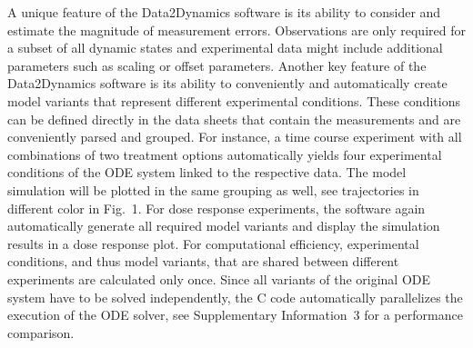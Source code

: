 \documentclass{bioinfo}
\begin{document}
A unique feature of the Data2Dynamics software is its ability to consider and estimate the magnitude of measurement errors.
Observations are only required for a subset of all dynamic states and experimental data %
might include additional parameters such as scaling or offset parameters.%
Another key feature of the Data2Dynamics software is its ability to conveniently and automatically create model variants that represent different experimental conditions. These conditions can be defined directly in the data sheets that contain the measurements and are conveniently parsed and grouped. 
For instance, a time course experiment 
with all combinations of two treatment options
automatically yields four experimental conditions
of the ODE system linked to the respective data. 
The model simulation will be plotted in the same grouping as well, see trajectories in different color in Fig.~1. %
For dose response experiments, %
the software again automatically generate all required model variants and display the simulation results in a dose response plot. For computational efficiency, experimental conditions, and thus model variants, that are shared between different experiments are calculated only once. Since all variants of the original ODE system have to be solved independently, the C code automatically parallelizes the execution of the ODE solver, see Supplementary Information~3 for a performance comparison. 
\end{document}
